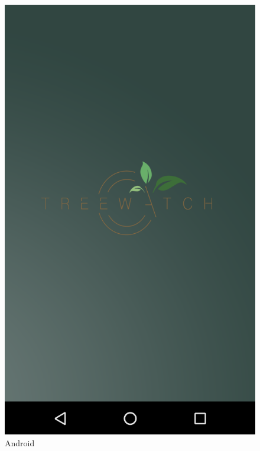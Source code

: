 \documentclass[12pt]{article}
\begin{document}
\begin{figure}[ht]
	\includegraphics[width=\linewidth, height=0.4\textheight, keepaspectratio=true, frame]{screenshots/LoadAnd.png}
	\caption{Android}
	\endminipage\hfill
\end{figure}
\end{document}
